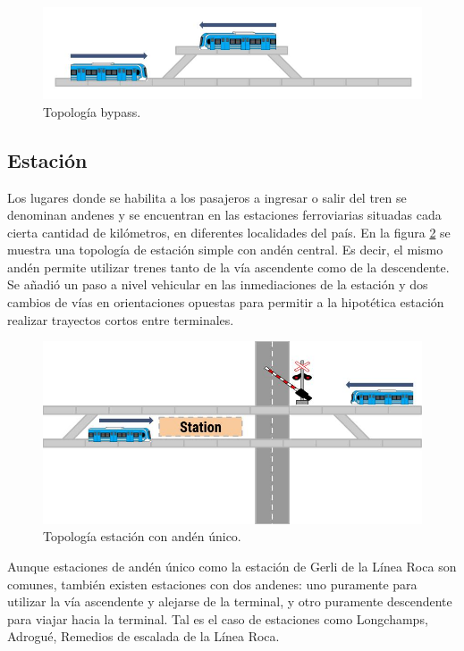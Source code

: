 		\begin{figure}[h]
		\centering
			\includegraphics[scale=.5]{./Figures/Bypass_2}
			\caption{Topología bypass.}
			\label{fig:Bypass}
		\end{figure}

	\vspace{5cm}
				
	\subsection{Estación}

		Los lugares donde se habilita a los pasajeros a ingresar o salir del tren se denominan andenes y se encuentran en las estaciones ferroviarias situadas cada cierta cantidad de kilómetros, en diferentes localidades del país. En la figura \ref{fig:Estacion} se muestra una topología de estación simple con andén central. Es decir, el mismo andén permite utilizar trenes tanto de la vía ascendente como de la descendente. Se añadió un paso a nivel vehicular en las inmediaciones de la estación y dos cambios de vías en orientaciones opuestas para permitir a la hipotética estación realizar trayectos cortos entre terminales.
		
			\begin{figure}[h]
			\centering
				\includegraphics[scale=.5]{./Figures/Estacion}
				\caption{Topología estación con andén único.}
				\label{fig:Estacion}
			\end{figure}
		
		Aunque estaciones de andén único como la estación de Gerli de la Línea Roca son comunes, también existen estaciones con dos andenes: uno puramente para utilizar la vía ascendente y alejarse de la terminal, y otro puramente descendente para viajar hacia la terminal. Tal es el caso de estaciones como Longchamps, Adrogué, Remedios de escalada de la Línea Roca.


